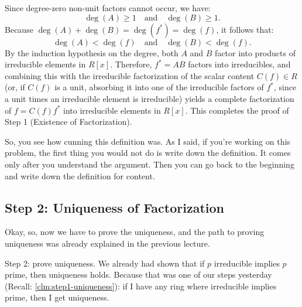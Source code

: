 \begin{proofWrapper}
\begin{content}
\begin{steps}
Since degree-zero non-unit factors cannot occur, we have:
\[
\deg(A) \ge 1 \quad \text{and} \quad \deg(B) \ge 1.
\]
Because $\deg(A) + \deg(B) = \deg(f^*) = \deg(f)$, it follows that:
\[
\deg(A) < \deg(f) \quad \text{and} \quad \deg(B) < \deg(f).
\]
By the induction hypothesis on the degree, both $A$ and $B$ factor into products of irreducible elements in $R[x]$. Therefore, $f^* = AB$ factors into irreducibles, and combining this with the irreducible factorization of the scalar content $C(f) \in R$ (or, if $C(f)$ is a unit, absorbing it into one of the irreducible factors of $f^*$, since a unit times an irreducible element is irreducible) yields a complete factorization of $f = C(f) f^*$ into irreducible elements in $R[x]$.
This completes the proof of Step 1 (Existence of Factorization).
\end{steps}
\end{content}

\begin{hidden}
\end{hidden}

\begin{speech}[00:30:58 - 00:31:28]
So, you see how cunning this definition was. As I said, if you're working on this problem, the first thing you would not do is write down the definition. It comes only after you understand the argument. Then you can go back to the beginning and write down the definition for content. 
\end{speech}

\subsection{Step 2: Uniqueness of Factorization}

\begin{speech}[00:31:28 - 00:33:17]
Okay, so, now we have to prove the uniqueness, and the path to proving uniqueness was already explained in the previous lecture.

Step 2: prove uniqueness.  We already had shown that if $p$ irreducible implies $p$ prime, then uniqueness holds.  Because that was one of our steps yesterday (Recall: \cref{clm:step1-uniqueness}): if I have any ring where irreducible implies prime, then I get uniqueness.


\end{speech}
\end{proofWrapper}
